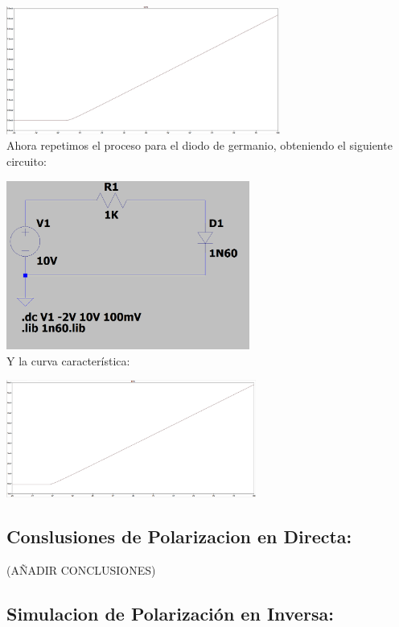 \includegraphics[width=9cm]{imagenes/simulacion11.png}\\

Ahora repetimos el proceso para el diodo de germanio, obteniendo el siguiente circuito:

\includegraphics[width=8cm]{imagenes/Circuito2.png}\\

Y la curva característica:

\includegraphics[width=8.2cm]{imagenes/simulacion2.png}\\

\subsection{Conslusiones de Polarizacion en Directa:}

(AÑADIR CONCLUSIONES)

\vspace{1cm}

\subsection{Simulacion de Polarización en Inversa:}

